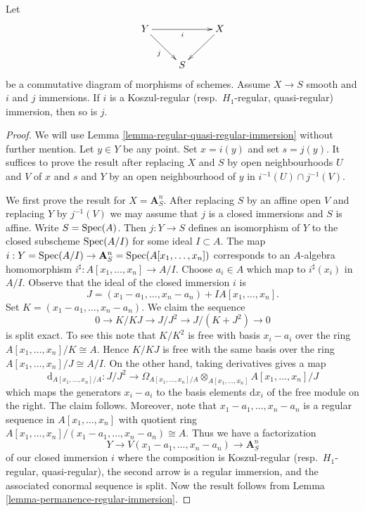 \begin{lemma}
\label{lemma-push-regular-immersion-thru-smooth}
Let
$$
\xymatrix{
Y \ar[rd]_j \ar[rr]_i & & X \ar[ld] \\
& S
}
$$
be a commutative diagram of morphisms of schemes.
Assume $X \to S$ smooth and $i$ and $j$ immersions.
If $i$ is a Koszul-regular (resp.\ $H_1$-regular, quasi-regular)
immersion, then so is $j$.
\end{lemma}

\begin{proof}
We will use Lemma \ref{lemma-regular-quasi-regular-immersion}
without further mention.
Let $y \in Y$ be any point. Set $x = i(y)$ and set $s = j(y)$.
It suffices to prove the result after replacing $X$ and $S$ by open
neighbourhoods $U$ and $V$ of $x$ and $s$ and $Y$ by an open neighbourhood
of $y$ in $i^{-1}(U) \cap j^{-1}(V)$.

\medskip\noindent
We first prove the result for $X = \mathbf{A}^n_S$. After replacing $S$
by an affine open $V$ and replacing $Y$ by $j^{-1}(V)$ we may assume that
$j$ is a closed immersions and $S$ is affine. Write $S = \mathop{\mathrm{Spec}}(A)$.
Then $j : Y \to S$ defines an isomorphism of $Y$ to the closed subscheme
$\mathop{\mathrm{Spec}}(A/I)$ for some ideal $I \subset A$. The map
$i : Y = \mathop{\mathrm{Spec}}(A/I) \to
\mathbf{A}^n_S = \mathop{\mathrm{Spec}}(A[x_1, \ldots, x_n])$
corresponds to an $A$-algebra homomorphism
$i^\sharp : A[x_1, \ldots, x_n] \to A/I$.
Choose $a_i \in A$ which map to $i^\sharp(x_i)$ in $A/I$.
Observe that the ideal of the closed immersion $i$ is
$$
J = (x_1 - a_1, \ldots, x_n - a_n) + IA[x_1, \ldots, x_n].
$$
Set $K = (x_1 - a_1, \ldots, x_n - a_n)$. We claim the sequence
$$
0 \to K/KJ \to J/J^2 \to J/(K + J^2) \to 0
$$
is split exact. To see this note that $K/K^2$ is free with basis
$x_i - a_i$ over the ring $A[x_1, \ldots, x_n]/K \cong A$.
Hence $K/KJ$ is free with the same basis over the ring
$A[x_1, \ldots, x_n]/J \cong A/I$. On the other hand, taking derivatives
gives a map
$$
\text{d}_{A[x_1, \ldots, x_n]/A} :
J/J^2
\longrightarrow
\Omega_{A[x_1, \ldots, x_n]/A} \otimes_{A[x_1, \ldots, x_n]}
A[x_1, \ldots, x_n]/J
$$
which maps the generators $x_i - a_i$ to the basis elements $\text{d}x_i$
of the free module on the right. The claim follows. Moreover, note that
$x_1 - a_1, \ldots, x_n - a_n$ is a regular sequence in
$A[x_1, \ldots, x_n]$ with quotient ring
$A[x_1, \ldots, x_n]/(x_1 - a_1, \ldots, x_n - a_n) \cong A$.
Thus we have a factorization
$$
Y \to V(x_1 - a_1, \ldots, x_n - a_n) \to \mathbf{A}^n_S
$$
of our closed immersion $i$ where the composition is
Koszul-regular (resp.\ $H_1$-regular, quasi-regular),
the second arrow is a regular immersion, and the associated conormal
sequence is split. Now the result follows from
Lemma \ref{lemma-permanence-regular-immersion}.


\end{proof}
